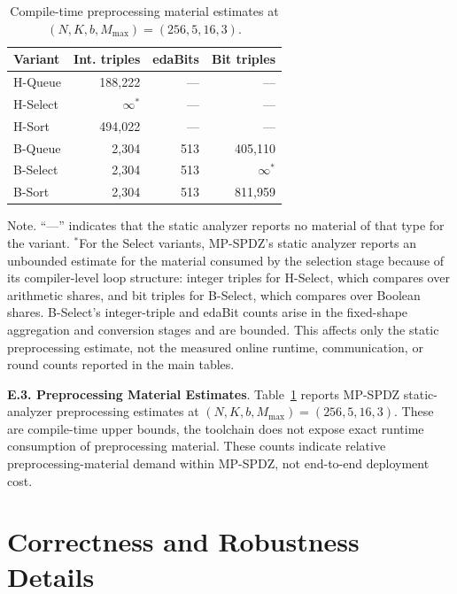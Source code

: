 \documentclass[conference,compsoc,letterpaper]{IEEEtran}
\theoremstyle{definition}
\theoremstyle{remark}
\newcommand{\myparagraph}[1]{\noindent \textbf{#1}.}
\newcommand{\Mmax}{M_{\max}}
\newcommand{\scorebits}{b}
\newcommand{\HSort}{H-Sort}
\newcommand{\HQueue}{H-Queue}
\newcommand{\HSelect}{H-Select}
\newcommand{\BSort}{B-Sort}
\newcommand{\BQueue}{B-Queue}
\newcommand{\BSelect}{B-Select}
\begin{document}
\begin{table}[h]
\centering
\small
\caption{Compile-time preprocessing material estimates at
$(N,K,\scorebits,\Mmax)=(256,5,16,3)$. }
\label{tab:preproc_estimates}
\begin{tabular}{@{}lrrr@{}}
\toprule
\textbf{Variant} & \textbf{Int. triples} &
\textbf{edaBits} & \textbf{Bit triples} \\
\midrule
\HQueue{}  & 188{,}222       & ---             & ---             \\
\HSelect{} & $\infty^\ast$   & ---             & ---             \\
\HSort{}   & 494{,}022       & ---             & ---             \\
\BQueue{}  & 2{,}304         & 513             & 405{,}110       \\
\BSelect{} & 2{,}304         & 513             & $\infty^\ast$   \\
\BSort{}   & 2{,}304         & 513             & 811{,}959       \\
\bottomrule
\end{tabular}

\smallskip
\footnotesize
\parbox{\linewidth}{
{Note.} ``---'' indicates that the static analyzer reports no material of that type for the variant. $^{\ast}$For the Select variants, MP-SPDZ's static analyzer reports an unbounded estimate for the material consumed by the selection stage because of its compiler-level loop structure: integer triples for H-Select, which compares over arithmetic shares, and bit triples for B-Select, which compares over Boolean shares. B-Select's integer-triple and edaBit counts arise in the fixed-shape aggregation and conversion stages and are bounded. This affects only the static preprocessing estimate, not the measured online runtime, communication, or round counts reported in the main tables.}
\vspace{-2mm}

\end{table}

\myparagraph{E.3. Preprocessing Material Estimates}
\label{app:preproc}
Table~\ref{tab:preproc_estimates} reports MP-SPDZ static-analyzer preprocessing estimates at \((N,K,b,\Mmax)=(256,5,16,3)\). These are compile-time upper bounds, the toolchain does not expose exact runtime consumption of preprocessing material.
These counts indicate relative preprocessing-material demand within MP-SPDZ, not end-to-end deployment cost.

\section{Correctness and Robustness Details}
\label{app:correctness}
\vspace{-2mm}
\end{document}

